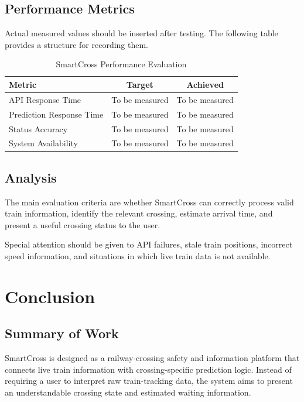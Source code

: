 \documentclass[12pt,a4paper]{report}
\begin{document}
\section{Performance Metrics}

Actual measured values should be inserted after testing. The following table
provides a structure for recording them.

\begin{table}[H]
\centering
\begin{tabular}{|>{\raggedright\arraybackslash}p{4cm}|c|c|}
  \hline
  \textbf{Metric} & \textbf{Target} & \textbf{Achieved} \\
  \hline
  API Response Time & To be measured & To be measured \\
  \hline
  Prediction Response Time & To be measured & To be measured \\
  \hline
  Status Accuracy & To be measured & To be measured \\
  \hline
  System Availability & To be measured & To be measured \\
  \hline
\end{tabular}
\caption{SmartCross Performance Evaluation}
\label{tab:performance}
\end{table}

\section{Analysis}

The main evaluation criteria are whether SmartCross can correctly process valid
train information, identify the relevant crossing, estimate arrival time, and
present a useful crossing status to the user.

Special attention should be given to API failures, stale train positions,
incorrect speed information, and situations in which live train data is not
available.


\chapter{Conclusion}

\section{Summary of Work}

SmartCross is designed as a railway-crossing safety and information platform that
connects live train information with crossing-specific prediction logic. Instead
of requiring a user to interpret raw train-tracking data, the system aims to
present an understandable crossing state and estimated waiting information.
\end{document}
